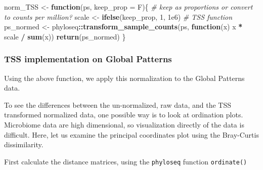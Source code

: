 \documentclass[
]{book}
\newenvironment{Shaded}{\begin{snugshade}}{\end{snugshade}}
\newcommand{\CommentTok}[1]{\textcolor[rgb]{0.56,0.35,0.01}{\textit{#1}}}
\newcommand{\ControlFlowTok}[1]{\textcolor[rgb]{0.13,0.29,0.53}{\textbf{#1}}}
\newcommand{\DataTypeTok}[1]{\textcolor[rgb]{0.13,0.29,0.53}{#1}}
\newcommand{\DecValTok}[1]{\textcolor[rgb]{0.00,0.00,0.81}{#1}}
\newcommand{\FloatTok}[1]{\textcolor[rgb]{0.00,0.00,0.81}{#1}}
\newcommand{\KeywordTok}[1]{\textcolor[rgb]{0.13,0.29,0.53}{\textbf{#1}}}
\newcommand{\NormalTok}[1]{#1}
\newcommand{\OperatorTok}[1]{\textcolor[rgb]{0.81,0.36,0.00}{\textbf{#1}}}
\newcommand{\StringTok}[1]{\textcolor[rgb]{0.31,0.60,0.02}{#1}}
\begin{document}
\begin{Shaded}
\begin{Highlighting}[]
\NormalTok{norm\_TSS \textless{}{-}}\StringTok{ }\ControlFlowTok{function}\NormalTok{(ps, }\DataTypeTok{keep\_prop =}\NormalTok{ F)\{}
    \CommentTok{\# keep as proportions or convert to counts per million?}
\NormalTok{    scale \textless{}{-}}\StringTok{ }\KeywordTok{ifelse}\NormalTok{(keep\_prop, }\DecValTok{1}\NormalTok{, }\FloatTok{1e6}\NormalTok{)}
    \CommentTok{\# TSS function}
\NormalTok{    ps\_normed \textless{}{-}}\StringTok{ }\NormalTok{phyloseq}\OperatorTok{::}\KeywordTok{transform\_sample\_counts}\NormalTok{(ps, }\ControlFlowTok{function}\NormalTok{(x) x }\OperatorTok{*}\StringTok{ }\NormalTok{scale }\OperatorTok{/}\StringTok{ }\KeywordTok{sum}\NormalTok{(x))}
    \KeywordTok{return}\NormalTok{(ps\_normed)}
\NormalTok{\}}
\end{Highlighting}
\end{Shaded}

\hypertarget{tss-implementation-on-global-patterns}{%
\subsubsection{TSS implementation on Global Patterns}\label{tss-implementation-on-global-patterns}}

Using the above function, we apply this normalization to the Global Patterns data.

\begin{Shaded}
\end{Shaded}

To see the differences between the un-normalized, raw data, and the TSS transformed normalized data, one possible way is to look at ordination plots. Microbiome data are high dimensional, so visualization directly of the data is difficult. Here, let us examine the principal coordinates plot using the Bray-Curtis dissimilarity.

First calculate the distance matrices, using the \texttt{phyloseq} function \texttt{ordinate()}
\end{document}
